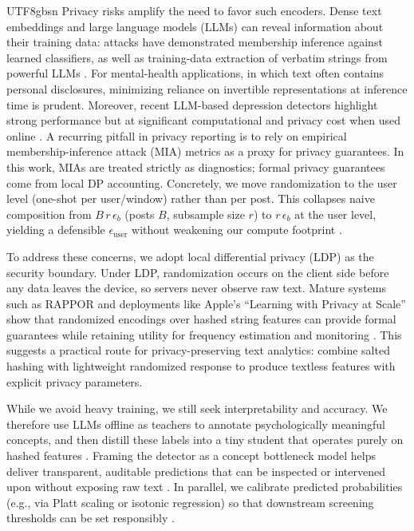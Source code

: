 \documentclass[lettersize,journal]{IEEEtran}
\begin{document}
\begin{CJK*}{UTF8}{gbsn}
Privacy risks amplify the need to favor such encoders. Dense text embeddings and large language models (LLMs) can reveal information about their training data: attacks have demonstrated membership inference against learned classifiers, as well as training-data extraction of verbatim strings from powerful LLMs \cite{shokri2017mia,shejwalkar2021nlpmia,carlini2021extracting}. For mental-health applications, in which text often contains personal disclosures, minimizing reliance on invertible representations at inference time is prudent. Moreover, recent LLM-based depression detectors highlight strong performance but at significant computational and privacy cost when used online \cite{qin2023readdiagnosechat}. A recurring pitfall in privacy reporting is to rely on empirical membership-inference attack (MIA) metrics as a proxy for privacy guarantees. In this work, MIAs are treated strictly as diagnostics; formal privacy guarantees come from local DP accounting. Concretely, we move randomization to the user level (one-shot per user/window) rather than per post. This collapses naive composition from $B\,r\,\epsilon_b$ (posts $B$, subsample size $r$) to $r\,\epsilon_b$ at the user level, yielding a defensible $\epsilon_{\text{user}}$ without weakening our compute footprint \cite{duchi2013localprivacy,kairouz2015composition,bittau2017prochlo}.

To address these concerns, we adopt local differential privacy (LDP) as the security boundary. Under LDP, randomization occurs on the client side before any data leaves the device, so servers never observe raw text. Mature systems such as RAPPOR and deployments like Apple’s ``Learning with Privacy at Scale'' show that randomized encodings over hashed string features can provide formal guarantees while retaining utility for frequency estimation and monitoring \cite{erling2014rappor,wang2017ldp,apple2017privacy}. This suggests a practical route for privacy-preserving text analytics: combine salted hashing with lightweight randomized response to produce textless features with explicit privacy parameters.

While we avoid heavy training, we still seek interpretability and accuracy. We therefore use LLMs offline as teachers to annotate psychologically meaningful concepts, and then distill these labels into a tiny student that operates purely on hashed features \cite{hinton2015distilling,demszky2020goemotions}. Framing the detector as a concept bottleneck model helps deliver transparent, auditable predictions that can be inspected or intervened upon without exposing raw text \cite{koh2020concept}. In parallel, we calibrate predicted probabilities (e.g., via Platt scaling or isotonic regression) so that downstream screening thresholds can be set responsibly \cite{guo2017calibration,zadrozny2002calibration}.


\end{CJK*}
\end{document}
